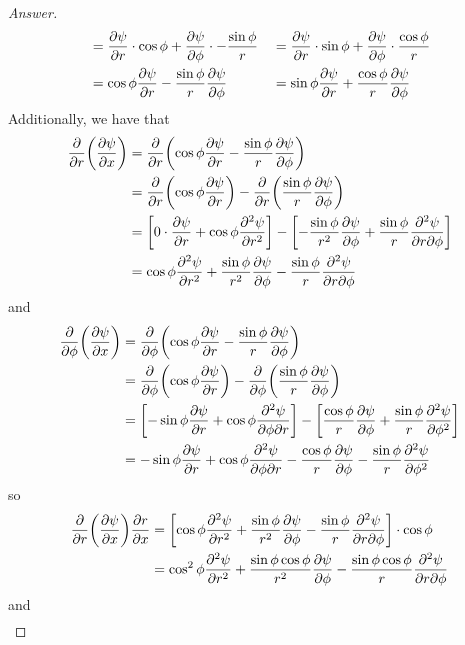 \documentclass[../psets.tex]{subfiles}
\begin{document}
\begin{enumerate}
\begin{enumerate}
\begin{proof}[Answer]
\begin{align*}
                &= \pdv{\psi}{r}\cdot\cos\phi+\pdv{\psi}{\phi}\cdot-\frac{\sin\phi}{r}&
                    &= \pdv{\psi}{r}\cdot\sin\phi+\pdv{\psi}{\phi}\cdot\frac{\cos\phi}{r}\\
                &= \cos\phi\pdv{\psi}{r}-\frac{\sin\phi}{r}\pdv{\psi}{\phi}&
                    &= \sin\phi\pdv{\psi}{r}+\frac{\cos\phi}{r}\pdv{\psi}{\phi}
            \end{align*}
            Additionally, we have that
            \begin{align*}
                \pdv{r}(\pdv{\psi}{x}) &= \pdv{r}(\cos\phi\pdv{\psi}{r}-\frac{\sin\phi}{r}\pdv{\psi}{\phi})\\
                &= \pdv{r}(\cos\phi\pdv{\psi}{r})-\pdv{r}(\frac{\sin\phi}{r}\pdv{\psi}{\phi})\\
                &= \left[ 0\cdot\pdv{\psi}{r}+\cos\phi\pdv[2]{\psi}{r} \right]-\left[ -\frac{\sin\phi}{r^2}\pdv{\psi}{\phi}+\frac{\sin\phi}{r}\pdv{\psi}{r}{\phi} \right]\\
                &= \cos\phi\pdv[2]{\psi}{r}+\frac{\sin\phi}{r^2}\pdv{\psi}{\phi}-\frac{\sin\phi}{r}\pdv{\psi}{r}{\phi}
            \end{align*}
            and
            \begin{align*}
                \pdv{\phi}(\pdv{\psi}{x}) &= \pdv{\phi}(\cos\phi\pdv{\psi}{r}-\frac{\sin\phi}{r}\pdv{\psi}{\phi})\\
                &= \pdv{\phi}(\cos\phi\pdv{\psi}{r})-\pdv{\phi}(\frac{\sin\phi}{r}\pdv{\psi}{\phi})\\
                &= \left[ -\sin\phi\pdv{\psi}{r}+\cos\phi\pdv{\psi}{\phi}{r} \right]-\left[ \frac{\cos\phi}{r}\pdv{\psi}{\phi}+\frac{\sin\phi}{r}\pdv[2]{\psi}{\phi} \right]\\
                &= -\sin\phi\pdv{\psi}{r}+\cos\phi\pdv{\psi}{\phi}{r}-\frac{\cos\phi}{r}\pdv{\psi}{\phi}-\frac{\sin\phi}{r}\pdv[2]{\psi}{\phi}
            \end{align*}
            so
            \begin{align*}
                \pdv{r}(\pdv{\psi}{x})\pdv{r}{x} &= \left[ \cos\phi\pdv[2]{\psi}{r}+\frac{\sin\phi}{r^2}\pdv{\psi}{\phi}-\frac{\sin\phi}{r}\pdv{\psi}{r}{\phi} \right]\cdot\cos\phi\\
                &= \cos^2\phi\pdv[2]{\psi}{r}+\frac{\sin\phi\cos\phi}{r^2}\pdv{\psi}{\phi}-\frac{\sin\phi\cos\phi}{r}\pdv{\psi}{r}{\phi}
            \end{align*}
            and
            \begin{align*}

\end{align*}
\end{proof}
\end{enumerate}
\end{enumerate}
\end{document}
